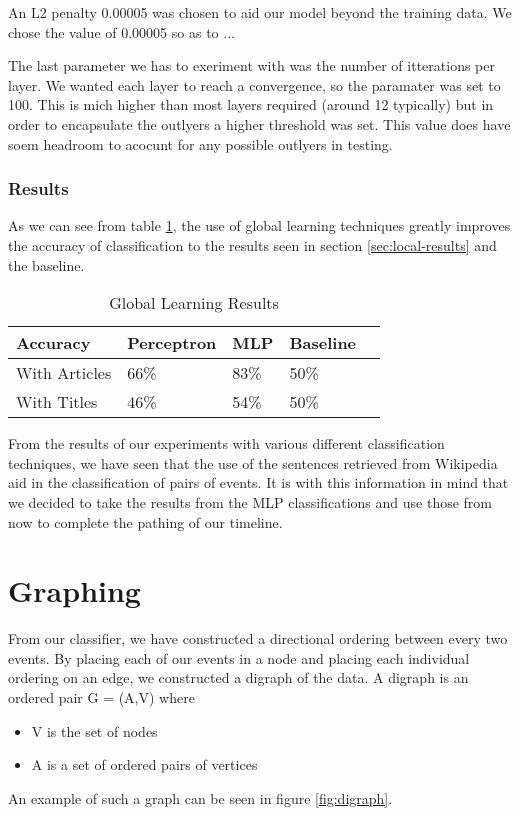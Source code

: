 \documentclass[bsc,frontabs,twoside,singlespacing,parskip,deptreport]{infthesis}     %
\begin{document}
An L2 penalty 0.00005 was chosen to aid our model beyond the training data.
We chose the value of 0.00005 so as to ...

The last parameter we has to exeriment with was the number of itterations per layer.
We wanted each layer to reach a convergence, so the paramater was set to 100.
This is mich higher than most layers required (around 12 typically) but in order to encapsulate the outlyers
a higher threshold was set. This value does have soem headroom to acocunt for any possible outlyers in testing.

\subsection{Results}
As we can see from table \ref{table:global-learning},  the use of global learning techniques greatly improves the accuracy
of classification to the results seen in section \ref{sec:local-results} and the baseline.

\begin{table}[H]
\centering
\label{table:global-learning}
\begin{tabular}{|p{5em}|l|l|p{4em}|l|}
  \hline
  {\small Accuracy}  & {\small Perceptron} & {\small MLP} & Baseline\\
  \hline
{\small With Articles}    & 66\%  & 83\% & 50\%\\
\hline
{\small With Titles} & 46\%  & 54\% & 50\%\\
\hline
\end{tabular}
\caption{Global Learning Results}
\end{table}

From the results of our experiments with various different classification techniques, we have seen that the use of the sentences retrieved
from Wikipedia aid in the classification of pairs of events. It is with this information in mind that we decided to take the results from
the MLP classifications and use those from now to complete the pathing of our timeline.

\chapter{Graphing}
From our classifier, we have constructed a directional ordering between every two events.
By placing each of our events in a node and placing each individual ordering on an edge, we constructed
a digraph of the data.
A digraph is an ordered pair G = (A,V) where\cite{bang2008digraphs}
\begin{itemize}
  \item V is the set of nodes
  \item A is a set of ordered pairs of vertices
\end{itemize}
An example of such a graph can be seen in figure \ref{fig:digraph}.
\end{document}
